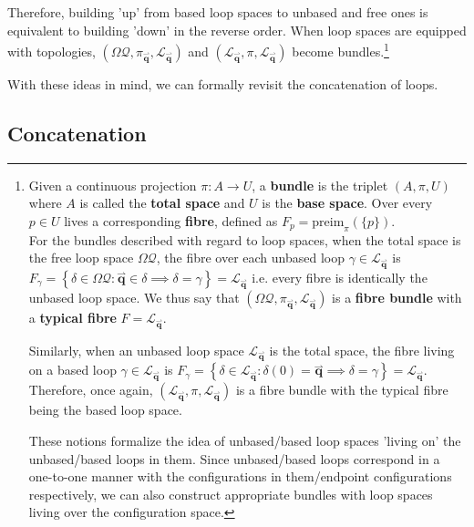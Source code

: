 \documentclass[oneside]{book}
\newcommand{\harp}{\overset{\rightharpoonup}}
\newcommand{\preim}{\text{preim}}
\begin{document}
Therefore, building 'up' from based loop spaces to unbased and free ones is equivalent to building 'down' in the reverse order. When loop spaces are equipped with topologies, $(\Omega \mathcal{Q}, \pi_{\harp{\pmb{q}}}, \mathcal{L}_{\harp{\pmb{q}}})$ and $(\mathcal{L}_{\harp{\pmb{q}}}, \pi, \mathscr{L}_{\harp{\pmb{q}}})$ become bundles.\footnote{Given a continuous projection $\pi : A \to U$, a \textbf{bundle} is the triplet $(A, \pi, U)$ where $A$ is called the \textbf{total space} and $U$ is the \textbf{base space}. Over every $p \in U$ lives a corresponding \textbf{fibre}, defined as $F_p = \preim_{\pi}(\{ p \})$. \\ 

For the bundles described with regard to loop spaces, when the total space is the free loop space $\Omega \mathcal{Q}$, the fibre over each unbased loop $\gamma \in \mathcal{L}_{\harp{\pmb{q}}}$ is $F_{\gamma} = \left\{ \delta \in \Omega \mathcal{Q} : \harp{\pmb{q}} \in \delta \implies \delta = \gamma \right\} = \mathcal{L}_{\harp{\pmb{q}}}$ i.e. every fibre is identically the unbased loop space. We thus say that $(\Omega \mathcal{Q}, \pi_{\harp{\pmb{q}}}, \mathcal{L}_{\harp{\pmb{q}}})$ is a \textbf{fibre bundle} with a \textbf{typical fibre} $F = \mathcal{L}_{\harp{\pmb{q}}}$.

Similarly, when an unbased loop space $\mathcal{L}_{\harp{\pmb{q}}}$ is the total space, the fibre living on a based loop $\gamma \in \mathscr{L}_{\harp{\pmb{q}}}$ is $F_{\gamma} = \left\{ \delta \in \mathcal{L}_{\harp{\pmb{q}}} : \delta(0) = \harp{\pmb{q}} \implies \delta = \gamma \right\} = \mathscr{L}_{\harp{\pmb{q}}}$. Therefore, once again, $(\mathcal{L}_{\harp{\pmb{q}}}, \pi, \mathscr{L}_{\harp{\pmb{q}}})$ is a fibre bundle with the typical fibre being the based loop space. 

These notions formalize the idea of unbased/based loop spaces 'living on' the unbased/based loops in them. Since unbased/based loops correspond in a one-to-one manner with the configurations in them/endpoint configurations respectively, we can also construct appropriate bundles with loop spaces living over the configuration space.\label{loop_bundles}}

With these ideas in mind, we can formally revisit the concatenation of loops.

\subsection{Concatenation}
\end{document}
